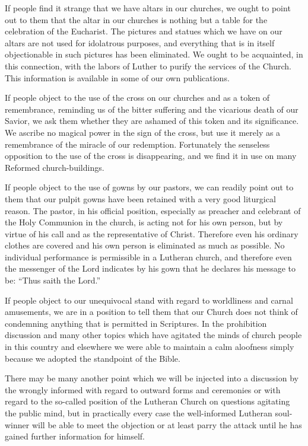 \documentclass[
]{book}
\begin{document}
If people find it strange that we have altars in our churches, we ought to point out to them that the altar in our churches is nothing but a table for the celebration of the Eucharist. The pictures and statues which we have on our altars are not used for idolatrous purposes, and everything that is in itself objectionable in such pictures has been eliminated. We ought to be acquainted, in this connection, with the labors of Luther to purify the services of the Church. This information is available in some of our own publications.

If people object to the use of the cross on our churches and as a token of remembrance, reminding us of the bitter suffering and the vicarious death of our Savior, we ask them whether they are ashamed of this token and its significance. We ascribe no magical power in the sign of the cross, but use it merely as a remembrance of the miracle of our redemption. Fortunately the senseless opposition to the use of the cross is disappearing, and we find it in use on many Reformed church-buildings.

If people object to the use of gowns by our pastors, we can readily point out to them that our pulpit gowns have been retained with a very good liturgical reason. The pastor, in his official position, especially as preacher and celebrant of the Holy Communion in the church, is acting not for his own person, but by virtue of his call and as the representative of Christ. Therefore even his ordinary clothes are covered and his own person is eliminated as much as possible. No individual performance is permissible in a Lutheran church, and therefore even the messenger of the Lord indicates by his gown that he declares his message to be: ``Thus saith the Lord.''

If people object to our unequivocal stand with regard to worldliness and carnal amusements, we are in a position to tell them that our Church does not think of condemning anything that is permitted in Scriptures. In the prohibition discussion and many other topics which have agitated the minds of church people in this country and elsewhere we were able to maintain a calm aloofness simply because we adopted the standpoint of the Bible.

There may be many another point which we will be injected into a discussion by the wrongly informed with regard to outward forms and ceremonies or with regard to the so-called position of the Lutheran Church on questions agitating the public mind, but in practically every case the well-informed Lutheran soul-winner will be able to meet the objection or at least parry the attack until he has gained further information for himself.
\end{document}
